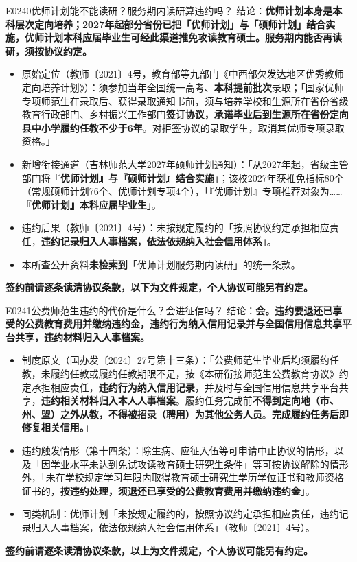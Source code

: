 \begin{qa}{E0240}{优师计划能不能读研？服务期内读研算违约吗？}
结论：\textbf{优师计划本身是本科层次定向培养；2027年起部分省份已把「优师计划」与「硕师计划」结合实施，优师计划本科应届毕业生可经此渠道推免攻读教育硕士。服务期内能否再读研，须按协议约定。}
\begin{itemize}
  \item 原始定位（教师〔2021〕4号，教育部等九部门《中西部欠发达地区优秀教师定向培养计划》）：须参加当年全国统一高考、\textbf{本科提前批次}录取；「国家优师专项师范生在录取后、获得录取通知书前，须与培养学校和生源所在省份省级教育行政部门、乡村振兴工作部门\textbf{签订协议，承诺毕业后到生源所在省份定向县中小学履约任教不少于6年}。对拒签协议的录取学生，取消其优师专项录取资格。」
  \item 新增衔接通道（吉林师范大学2027年硕师计划通知）：「从2027年起，省级主管部门将『\textbf{优师计划』与『硕师计划』结合实施}」；该校2027年获推免指标80个（常规硕师计划76个、优师计划专项4个），「『优师计划』专项推荐对象为……『\textbf{优师计划』本科应届毕业生}」。
  \item 违约后果（教师〔2021〕4号）：未按规定履约的「按照协议约定承担相应责任，\textbf{违约记录归入人事档案，依法依规纳入社会信用体系}」。
  \item 本所查公开资料\textbf{未检索到}「优师计划服务期内读研」的统一条款。
\end{itemize}
\textbf{签约前请逐条读清协议条款，以下为文件规定，个人协议可能另有约定。}
\end{qa}

\begin{qa}{E0241}{公费师范生违约的代价是什么？会进征信吗？}
结论：\textbf{会。违约要退还已享受的公费教育费用并缴纳违约金，违约行为纳入信用记录并与全国信用信息共享平台共享，违约材料归入人事档案。}
\begin{itemize}
  \item 制度原文（国办发〔2024〕27号第十三条）：「公费师范生毕业后均须履约任教，未履约任教或履约任教期限不足，按《本研衔接师范生公费教育协议》约定承担相应责任，\textbf{违约行为纳入信用记录}，并及时与全国信用信息共享平台共享，\textbf{违约相关材料归入本人人事档案}。履约任务完成前\textbf{不得到定向地（市、州、盟）之外从教，不得被招录（聘用）为其他公务人员}。\textbf{完成履约任务后即修复相关信用。}」
  \item 违约触发情形（第十四条）：除生病、应征入伍等可申请中止协议的情形，以及「因学业水平未达到免试攻读教育硕士研究生条件」等可按协议解除的情形外，「未在学校规定学习年限内取得教育硕士研究生学历学位证书和教师资格证书的，\textbf{按违约处理，须退还已享受的公费教育费用并缴纳违约金}」。
  \item 同类机制：优师计划「未按规定履约的，按照协议约定承担相应责任，违约记录归入人事档案，依法依规纳入社会信用体系」（教师〔2021〕4号）。
\end{itemize}
\textbf{签约前请逐条读清协议条款，以上为文件规定，个人协议可能另有约定。}
\end{qa}

